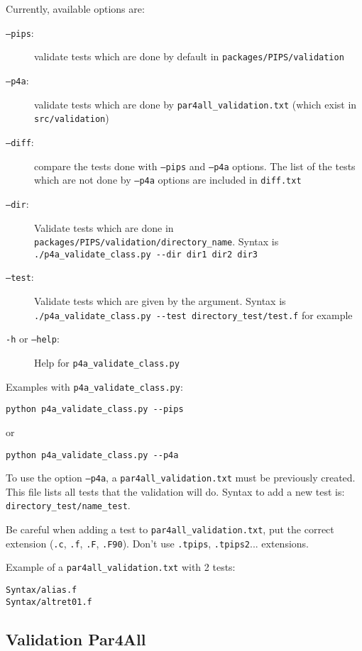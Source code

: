 \documentclass[a4paper]{article}
\begin{document}
Currently, available options are:
\begin{description}
\item[\texttt{--pips}:] validate tests which are done by default in
  \texttt{packages/PIPS/validation}

\item[\texttt{--p4a}:] validate tests which are done by
  \verb|par4all_validation.txt| (which exist in
  \texttt{src/validation})

\item[\texttt{--diff}:] compare the tests done with
  \texttt{--pips} and \texttt{--p4a} options. The list of the tests which
  are not done by \texttt{--p4a} options are included in \texttt{diff.txt}

\item[\texttt{--dir}:] Validate tests which are done in \verb|packages/PIPS/validation/directory_name|. Syntax is \verb|./p4a_validate_class.py --dir dir1 dir2 dir3|

\item[\texttt{--test}:] Validate tests which are given by the argument. Syntax is \verb|./p4a_validate_class.py --test directory_test/test.f| for example

\item[\texttt{-h} or \texttt{--help}:] Help for \verb|p4a_validate_class.py|
\end{description}

Examples with \verb|p4a_validate_class.py|:
\begin{verbatim}
python p4a_validate_class.py --pips
\end{verbatim}
or
\begin{verbatim}
python p4a_validate_class.py --p4a
\end{verbatim}

To use the option \texttt{--p4a}, a \verb|par4all_validation.txt| must be
previously created. This file lists all tests that the validation will do.
Syntax to add a new test is: \verb|directory_test/name_test|.

Be careful when adding a test to \verb|par4all_validation.txt|, put the
correct extension (\texttt{.c}, \texttt{.f}, \texttt{.F},
\texttt{.F90}). Don't use \texttt{.tpips}, \texttt{.tpips2}... extensions.

Example of a \verb|par4all_validation.txt| with 2 tests:
\begin{verbatim}
Syntax/alias.f
Syntax/altret01.f
\end{verbatim}

\subsection{Validation Par4All}
\end{document}
